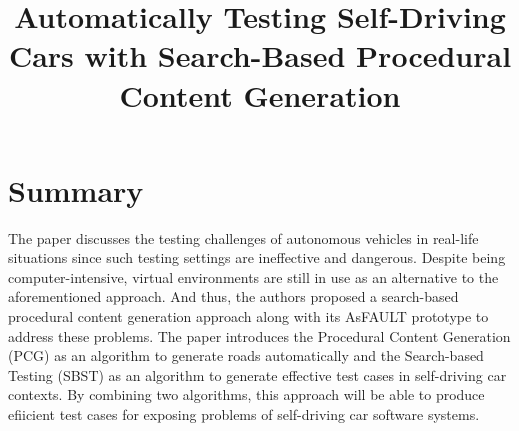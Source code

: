 \documentclass[10pt,a4paper]{report}
\title{Automatically Testing Self-Driving Cars with Search-Based Procedural Content Generation}
\begin{document}
\begin{center}
\textbf{\thetitle}
\end{center}


\section{Summary}
The paper discusses the testing challenges of autonomous vehicles in real-life situations since  such testing settings are ineffective and dangerous. 
%
Despite being computer-intensive, virtual environments are still in use as an alternative to the aforementioned approach. And thus, the authors proposed a search-based procedural content generation approach along with its AsFAULT prototype to address these problems. 
%
The paper introduces the Procedural Content Generation (PCG) as an algorithm to generate roads automatically and the Search-based Testing (SBST) as an algorithm to generate effective test cases in self-driving car contexts.
% 
By combining two algorithms, this approach will be able to produce efiicient test cases for exposing problems of self-driving car software systems.
\end{document}
